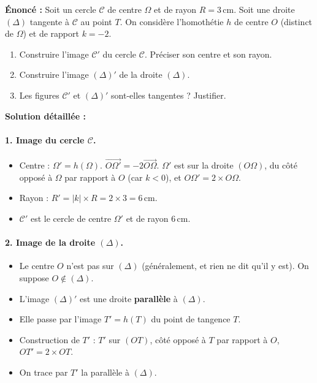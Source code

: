 \documentclass[11pt]{article}
\begin{document}
\begin{exoresolu}
\textbf{Énoncé :} Soit un cercle $\mathcal{C}$ de centre $\Omega$ et de rayon $R = 3\,\text{cm}$. Soit une droite $(\Delta)$ tangente à $\mathcal{C}$ au point $T$.
On considère l'homothétie $h$ de centre $O$ (distinct de $\Omega$) et de rapport $k = -2$.
\begin{enumerate}
    \item Construire l'image $\mathcal{C}'$ du cercle $\mathcal{C}$. Préciser son centre et son rayon.
    \item Construire l'image $(\Delta)'$ de la droite $(\Delta)$.
    \item Les figures $\mathcal{C}'$ et $(\Delta)'$ sont-elles tangentes ? Justifier.
\end{enumerate}
\tcblower
\textbf{Solution détaillée :}
\paragraph{1. Image du cercle $\mathcal{C}$.}
\begin{itemize}
    \item Centre : $\Omega' = h(\Omega)$. $\overrightarrow{O\Omega'} = -2 \overrightarrow{O\Omega}$. $\Omega'$ est sur la droite $(O\Omega)$, du côté opposé à $\Omega$ par rapport à $O$ (car $k<0$), et $O\Omega' = 2 \times O\Omega$.
    \item Rayon : $R' = |k| \times R = 2 \times 3 = 6\,\text{cm}$.
    \item $\mathcal{C}'$ est le cercle de centre $\Omega'$ et de rayon $6\,\text{cm}$.
\end{itemize}
\paragraph{2. Image de la droite $(\Delta)$.}
\begin{itemize}
    \item Le centre $O$ n'est pas sur $(\Delta)$ (généralement, et rien ne dit qu'il y est). On suppose $O \notin (\Delta)$.
    \item L'image $(\Delta)'$ est une droite \textbf{parallèle} à $(\Delta)$.
    \item Elle passe par l'image $T' = h(T)$ du point de tangence $T$.
    \item Construction de $T'$ : $T'$ sur $(OT)$, côté opposé à $T$ par rapport à $O$, $OT' = 2 \times OT$.
    \item On trace par $T'$ la parallèle à $(\Delta)$.
\end{itemize}

\end{exoresolu}
\end{document}
